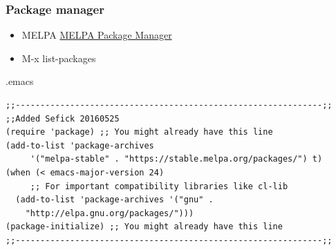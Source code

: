 \documentclass[t,10pt]{beamer}
\begin{document}
\begin{frame}[fragile]
\frametitle{Package manager}
\label{sec-2-8}

\begin{itemize}
\item MELPA \href{https://melpa.org/#/}{MELPA Package Manager}
\item M-x list-packages
\end{itemize}
\begin{exampleblock}{.emacs}
\label{sec-2-8-1}


\begin{verbatim}
;;--------------------------------------------------------------;;
;;Added Sefick 20160525
(require 'package) ;; You might already have this line
(add-to-list 'package-archives
     '("melpa-stable" . "https://stable.melpa.org/packages/") t)
(when (< emacs-major-version 24)
     ;; For important compatibility libraries like cl-lib
  (add-to-list 'package-archives '("gnu" . 
    "http://elpa.gnu.org/packages/")))
(package-initialize) ;; You might already have this line
;;--------------------------------------------------------------;;
\end{verbatim}
\end{exampleblock}
\end{frame}
\end{document}
